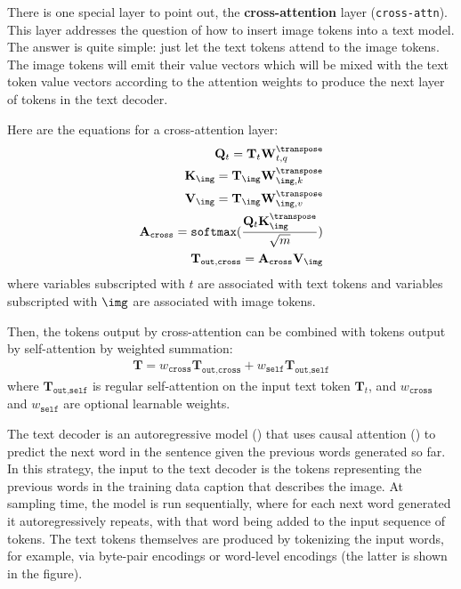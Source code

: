 There is one special layer to point out, the \textbf{cross-attention} layer (\texttt{cross-attn}). This layer addresses the question of how to insert image tokens into a text model. The answer is quite simple: just let the text tokens attend to the image tokens. The image tokens will emit their value vectors which will be mixed with the text token value vectors according to the attention weights to produce the next layer of tokens in the text decoder.

Here are the equations for a cross-attention layer:
\begin{align}
    \mathbf{Q}_{t} = \mathbf{T}_{t}\mathbf{W}_{t,q}^\transpose\\
    \mathbf{K}_{\img} = \mathbf{T}_{\img}\mathbf{W}_{\img,k}^\transpose\\
    \mathbf{V}_{\img} = \mathbf{T}_{\img}\mathbf{W}_{\img,v}^\transpose\\
    \mathbf{A}_{\texttt{cross}} = \texttt{softmax}(\frac{\mathbf{Q}_{t}\mathbf{K}_{\img}^\transpose}{\sqrt{m}})\\
    \mathbf{T}_{\texttt{out}, \texttt{cross}} = \mathbf{A}_{\texttt{cross}}\mathbf{V}_{\img}
\end{align}
where variables subscripted with $t$ are associated with text tokens and variables subscripted with $\img$ are associated with image tokens.

Then, the tokens output by cross-attention can be combined with tokens output by self-attention by weighted summation:
\begin{align}
	\mathbf{T} = w_{\texttt{cross}}\mathbf{T}_{\texttt{out}, \texttt{cross}}  + w_{\texttt{self}}\mathbf{T}_{\texttt{out}, \texttt{self}}
\end{align}
where $\mathbf{T}_{\texttt{out}, \texttt{self}}$ is regular self-attention on the input text token $\mathbf{T}_t$, and $w_{\texttt{cross}}$ and $w_{\texttt{self}}$ are optional learnable weights.

The text decoder is an autoregressive model (\sect{\ref{sec:generative_models:autoregressive}}) that uses causal attention (\sect{\ref{sec:transformers:masked_attention}}) to predict the next word in the sentence given the previous words generated so far. In this strategy, the input to the text decoder is the tokens representing the previous words in the training data caption that describes the image. At sampling time, the model is run sequentially, where for each next word generated it autoregressively repeats, with that word being added to the input sequence of tokens. The text tokens themselves are produced by tokenizing the input words, for example, via byte-pair encodings or word-level encodings (the latter is shown in the figure).

